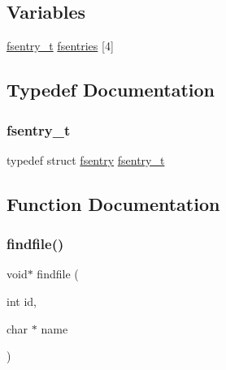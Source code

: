 \subsection*{Variables}
\begin{DoxyCompactItemize}
\item 
\hyperlink{a00152_a9ccf6560e8aebea3e4402a31e8c0f46b_a9ccf6560e8aebea3e4402a31e8c0f46b}{fsentry\+\_\+t} \hyperlink{a00152_a6b46131164b26e476762930c9aae4319_a6b46131164b26e476762930c9aae4319}{fsentries} \mbox{[}4\mbox{]}
\end{DoxyCompactItemize}


\subsection{Typedef Documentation}
\mbox{\label{a00152_a9ccf6560e8aebea3e4402a31e8c0f46b_a9ccf6560e8aebea3e4402a31e8c0f46b}} 
\subsubsection{\texorpdfstring{fsentry\+\_\+t}{fsentry\_t}}
{\footnotesize\ttfamily typedef struct \hyperlink{a00272}{fsentry}  \hyperlink{a00152_a9ccf6560e8aebea3e4402a31e8c0f46b_a9ccf6560e8aebea3e4402a31e8c0f46b}{fsentry\+\_\+t}}



\subsection{Function Documentation}
\mbox{\label{a00152_a89d79ab10f0c468a6c0d8403ddf50092_a89d79ab10f0c468a6c0d8403ddf50092}} 
\subsubsection{\texorpdfstring{findfile()}{findfile()}}
{\footnotesize\ttfamily void$\ast$ findfile (\begin{DoxyParamCaption}\item[{int}]{id,  }\item[{char $\ast$}]{name }\end{DoxyParamCaption})}



